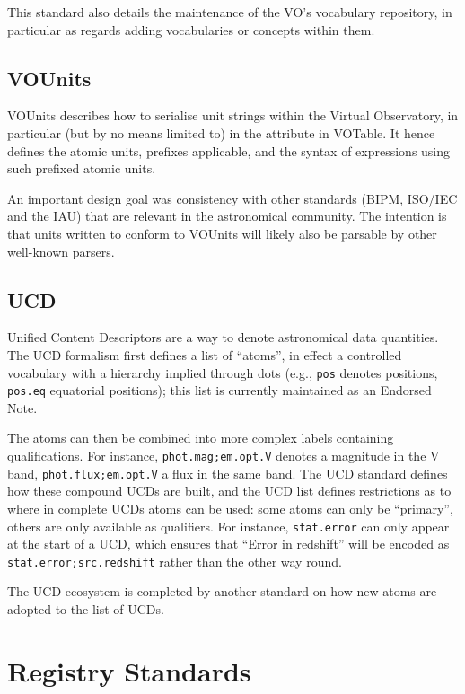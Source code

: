 \documentclass[11pt,a4paper]{ivoa}
\newcommand{\ucd}[1]{\texttt{#1}}
\begin{document}
This standard also details the maintenance of the VO's vocabulary
repository, in particular as regards adding vocabularies or concepts
within them.

\subsection{VOUnits}

VOUnits describes how to serialise unit strings within the Virtual
Observatory, in particular (but by no means limited to) in the
 attribute in VOTable.  It hence defines the atomic units,
prefixes applicable, and the syntax of expressions using such prefixed
atomic units. 

An important design goal was consistency with other standards (BIPM,
ISO/IEC and the IAU) that are relevant in the astronomical community.
The intention is that units written to conform to VOUnits will likely
also be parsable by other well-known parsers.

\subsection{UCD}

Unified Content Descriptors are a way to denote astronomical data
quantities.  The UCD formalism first defines a list of ``atoms'', in
effect a controlled vocabulary with a hierarchy implied through dots
(e.g., \ucd{pos} denotes positions, \ucd{pos.eq} equatorial positions);
this list is currently maintained as an Endorsed Note.

The atoms can then be combined into more complex labels containing
qualifications.  For instance, \ucd{phot.mag;em.opt.V} denotes a
magnitude in the V band, \ucd{phot.flux;em.opt.V} a flux in the same
band.  The UCD standard defines how these compound UCDs are built, and
the UCD list defines restrictions as to where in complete UCDs atoms can
be used: some atoms can only be ``primary'', others are only available
as qualifiers.  For instance, \ucd{stat.error} can only appear at the
start of a UCD, which ensures that ``Error in redshift'' will be encoded
as \ucd{stat.error;src.redshift} rather than the other way round.

The UCD ecosystem is completed by another standard on how new atoms are
adopted to the list of UCDs.

\section{Registry Standards}
\end{document}
